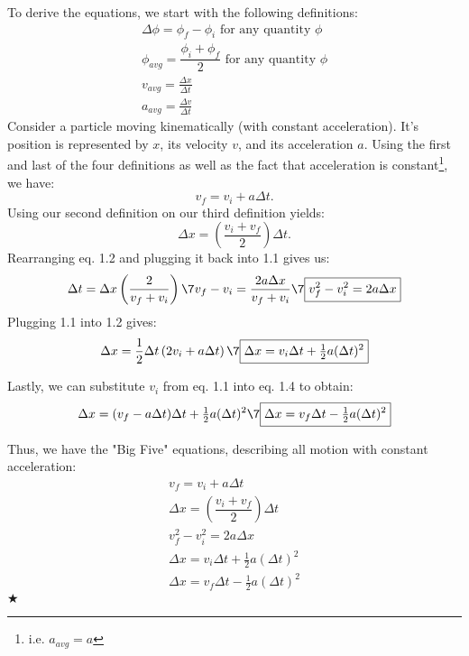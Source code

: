 \noindent To derive the equations, we start with the following definitions:
\begin{gather*}
\Delta \phi = \phi_f - \phi_i \text{ for any quantity } \phi \\
\phi_{avg} = \dfrac{\phi_i + \phi_f}{2} \text{ for any quantity }\phi \\
v_{avg} = \frac{\Delta x}{\Delta t} \\
a_{avg} = \frac{\Delta v}{\Delta t} 
\end{gather*}
\noindent Consider a particle moving kinematically (with constant acceleration). It's position is represented by $x$, its velocity $v$, and its acceleration $a$. Using the first and last of the four definitions as well as the fact that acceleration is constant\footnote{i.e. $a_{avg} = a$}, we have:
\begin{equation}
\boxed{v_f = v_i + a\Delta t}.
\end{equation}
\noindent Using our second definition on our third definition yields:
\begin{equation}
\boxed{\Delta x = \left( \dfrac{v_i + v_f}{2}\right) \Delta t}.
\end{equation}
\noindent Rearranging eq. 1.2 and plugging it back into 1.1 gives us:
\begin{gather}
\Delta t = \Delta x \left(\dfrac{2}{v_f + v_i}\right) \7
v_f - v_i = \dfrac{2a\Delta x}{v_f + v_i} \7
\boxed{v_f^2 - v_i^2 = 2a\Delta x}
\end{gather}
\clearpage
\noindent Plugging 1.1 into 1.2 gives:
\begin{gather}
\Delta x = \frac12 \Delta t \left( 2v_i + a\Delta t\right) \7
\boxed{\Delta x = v_i\Delta t + \tfrac12 a (\Delta t)^2}
\end{gather}

\noindent Lastly, we can substitute $v_i$ from eq. 1.1 into eq. 1.4 to obtain:
\begin{gather}
\Delta x = (v_f-a\Delta t)\Delta t + \tfrac12 a(\Delta t)^2  \7
\boxed{\Delta x = v_f\Delta t - \tfrac12 a(\Delta t)^2}
\end{gather}

\noindent Thus, we have the "Big Five" equations, describing all motion with constant acceleration:
\begin{gather}
v_f = v_i + a\Delta t \label{kin1}\\
\Delta x = \left( \dfrac{v_i + v_f}{2}\right) \Delta t \label{kin2} \\
v_f^2 - v_i^2 = 2a\Delta x \label{kin3} \\
\Delta x = v_i\Delta t + \tfrac12 a (\Delta t)^2 \label{kin4} \\
\Delta x = v_f\Delta t - \tfrac12 a(\Delta t)^2 \label{kin5}
\end{gather}
$\bigstar$


